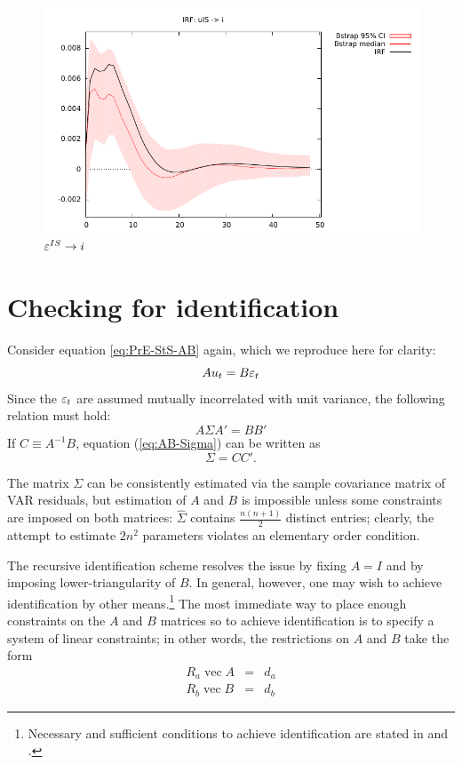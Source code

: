 \documentclass[a4paper,10pt]{article}
\newcommand{\PrE}[1]{\ensuremath u_{#1}} %
\newcommand{\StS}[1]{\ensuremath \varepsilon_{#1}} %
\DeclareMathOperator{\VEC}{\mathrm{vec}}
\begin{document}
\begin{figure}[htbp]
  \centering
  \includegraphics{dynamic_IS}
  \caption{$\StS{}^{IS} \to i$}
  \label{fig:Dynamic-IS}
\end{figure}

\section{Checking for identification}
\label{sec:SVARid}

Consider equation \eqref{eq:PrE-StS-AB} again, which we reproduce
here for clarity:
\[
  A \PrE{t} = B \StS{t}
\]
Since the $\StS{t}$ are assumed mutually incorrelated with unit variance,
the following relation must hold:
\begin{equation}
  \label{eq:AB-Sigma}
  A \Sigma A' = B B'
\end{equation}
If $C \equiv A^{-1}B$, equation (\ref{eq:AB-Sigma}) can be written as
\[
  \Sigma = C C'.
\]

The matrix $\Sigma$ can be consistently estimated via the sample
covariance matrix of VAR residuals, but estimation of $A$ and $B$ is
impossible unless some constraints are imposed on both matrices:
$\hat{\Sigma}$ contains $\frac{n (n+1)}{2}$ distinct entries; clearly,
the attempt to estimate $2 n^2$ parameters violates an elementary
order condition. 

The recursive identification scheme resolves the issue by fixing $A=I$
and by imposing lower-triangularity of $B$. In general, however, one
may wish to achieve identification by other means.\footnote{Necessary
  and sufficient conditions to achieve identification are stated in
  \cite{RR-W-Zha10} and \cite{Bacchiocchi11}.}  The most immediate way
to place enough constraints on the $A$ and $B$ matrices so to achieve
identification is to specify a system of linear constraints; in other
words, the restrictions on $A$ and $B$ take the form
\begin{eqnarray}
  \label{eq:ImpConstA}
  R_a \VEC A & = & d_a \\
  \label{eq:ImpConstB}
  R_b \VEC B & = & d_b 
\end{eqnarray}
\end{document}
